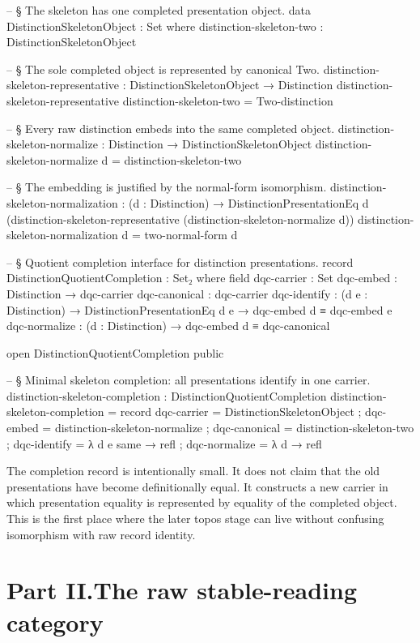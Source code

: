 \documentclass[11pt]{article}
\begin{document}
\begin{code}
-- § The skeleton has one completed presentation object.
data DistinctionSkeletonObject : Set where
  distinction-skeleton-two : DistinctionSkeletonObject

-- § The sole completed object is represented by canonical Two.
distinction-skeleton-representative : DistinctionSkeletonObject → Distinction
distinction-skeleton-representative distinction-skeleton-two = Two-distinction

-- § Every raw distinction embeds into the same completed object.
distinction-skeleton-normalize : Distinction → DistinctionSkeletonObject
distinction-skeleton-normalize d = distinction-skeleton-two

-- § The embedding is justified by the normal-form isomorphism.
distinction-skeleton-normalization :
  (d : Distinction) →
  DistinctionPresentationEq d
    (distinction-skeleton-representative (distinction-skeleton-normalize d))
distinction-skeleton-normalization d = two-normal-form d

-- § Quotient completion interface for distinction presentations.
record DistinctionQuotientCompletion : Set₂ where
  field
    dqc-carrier   : Set
    dqc-embed     : Distinction → dqc-carrier
    dqc-canonical : dqc-carrier
    dqc-identify  : (d e : Distinction) →
                    DistinctionPresentationEq d e → dqc-embed d ≡ dqc-embed e
    dqc-normalize : (d : Distinction) → dqc-embed d ≡ dqc-canonical

open DistinctionQuotientCompletion public

-- § Minimal skeleton completion: all presentations identify in one carrier.
distinction-skeleton-completion : DistinctionQuotientCompletion
distinction-skeleton-completion = record
  { dqc-carrier   = DistinctionSkeletonObject
  ; dqc-embed     = distinction-skeleton-normalize
  ; dqc-canonical = distinction-skeleton-two
  ; dqc-identify  = λ d e same → refl
  ; dqc-normalize = λ d → refl
  }
\end{code}

The completion record is intentionally small.  It does not claim that
the old presentations have become definitionally equal.  It constructs a
new carrier in which presentation equality is represented by
equality of the completed object.  This is the first place where the
later topos stage can live without confusing isomorphism with raw record
identity.

\part*{Part II.\quad The raw stable-reading category}
\end{document}
